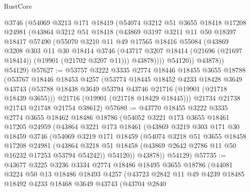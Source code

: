 \begin{lexlean}{RustCore}
\begin{coremodule}
          @3746
          (@54069
            @3213
            @171
            @18419
            (@54074
              @3212
              @51
              @3655
              @18418
              @17208
              @24981
              (@43864
                @3212
                @51
                @18418
                (@43869
                  @3197
                  @3211
                  @11
                  @50
                  @18397
                  @18417
                  @57490
                  (@55070
                    @3210
                    @11
                    @49
                    @17565
                    @18416
                    @55084
                    (@43869
                      @3208
                      @303
                      @11
                      @30
                      @18414
                      @3746
                      (@43717 @3207 @18414 (@21696 (@21697 @18414)) (@19901 (@21702 @3207 @11)))
                      @43878))))
              @54120))
          @43878))
      @54129)
@57627 := @53757
    @3222
    @3335
    @2774
    @18446
    @18455
    @3655
    @18788
    (@53767
      @18446
      @18453
      @4257
      (@53774
        @18445
        @18452
        @4233
        @18428
        @3649
        @43743
        (@53788 @18438 @3649 @53794 @43746 @21716 (@19901 (@21718 @18439 @3655)))
        @21716
        (@19901 (@21718 @18429 @18445)))
      @21734
      @21738
      @21743
      @21748
      @21754
      @38612)
@57680 := @43770
    @18455
    @3222
    @3335
    @2774
    @3655
    @18462
    @18486
    @18786
    (@54052
      @3221
      @173
      @3655
      @18461
      @17205
      @24959
      (@43864
        @3221
        @173
        @18461
        (@43869
          @3219
          @303
          @171
          @30
          @18459
          @3746
          (@54069
            @3219
            @171
            @18459
            (@54074
              @3218
              @51
              @3655
              @18458
              @17208
              @24981
              (@43864 @3218 @51 @18458 (@43869 @2642 @2786 @11 @50 @16232 @17253 @53794 @54242))
              @54120))
          @43878))
      @54129)
@57735 := @43677
    @3225
    @3236
    @3334
    @2774
    @18486
    @18495
    @3655
    @18786
    (@44081
      @3224
      @50
      @13
      @18486
      @18493
      @4257
      (@43723
        @2842
        @11
        @49
        @4239
        @18485
        @18492
        @4233
        @18468
        @3649
        @43743
        (@43704
          @2840

\end{coremodule}
\end{lexlean}
